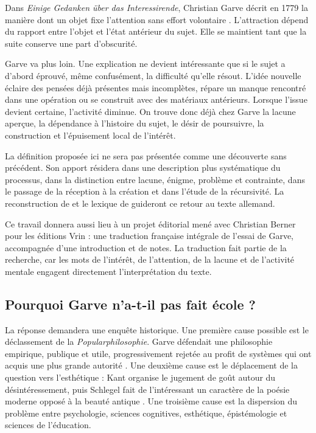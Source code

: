 \documentclass[11pt,a4paper]{article}
\begin{document}
Dans \emph{Einige Gedanken über das Interessirende}, Christian Garve décrit en
1779 la manière dont un objet fixe l'attention sans effort volontaire
\parencite[253--274, 313--317]{garve1779interessirende}. L'attraction dépend du
rapport entre l'objet et l'état antérieur du sujet. Elle se maintient tant que
la suite conserve une part d'obscurité.

Garve va plus loin. Une explication ne devient intéressante que si le sujet a
d'abord éprouvé, même confusément, la difficulté qu'elle résout. L'idée nouvelle
éclaire des pensées déjà présentes mais incomplètes, répare un manque rencontré
dans une opération ou se construit avec des matériaux antérieurs. Lorsque
l'issue devient certaine, l'activité diminue. On trouve donc déjà chez Garve la
lacune aperçue, la dépendance à l'histoire du sujet, le désir de poursuivre, la
construction et l'épuisement local de l'intérêt.

La définition proposée ici ne sera pas présentée comme une découverte sans
précédent. Son apport résidera dans une description plus systématique du
processus, dans la distinction entre lacune, énigme, problème et contrainte,
dans le passage de la réception à la création et dans l'étude de la
récursivité. La reconstruction de \textcite{nannini2018garve} et le lexique de
\textcite{nannini2018interesting} guideront ce retour au texte allemand.

Ce travail donnera aussi lieu à un projet éditorial mené avec Christian Berner
pour les éditions Vrin : une traduction française intégrale de l'essai de
Garve, accompagnée d'une introduction et de notes. La traduction fait partie de
la recherche, car les mots de l'intérêt, de l'attention, de la lacune et de
l'activité mentale engagent directement l'interprétation du texte.

\subsection{Pourquoi Garve n'a-t-il pas fait école ?}

La réponse demandera une enquête historique. Une première cause possible est le
déclassement de la \emph{Popularphilosophie}. Garve défendait une philosophie
empirique, publique et utile, progressivement rejetée au profit de systèmes qui
ont acquis une plus grande autorité \parencite{thompson2018garve,
bachmannmedick2008anziehungskraft}. Une deuxième cause est le déplacement de la
question vers l'esthétique : Kant organise le jugement de goût autour du
désintéressement, puis Schlegel fait de l'intéressant un caractère de la poésie
moderne opposé à la beauté antique \parencite{kant1993juger,
schlegel2001study}. Une troisième cause est la dispersion du problème entre
psychologie, sciences cognitives, esthétique, épistémologie et sciences de
l'éducation.
\end{document}
